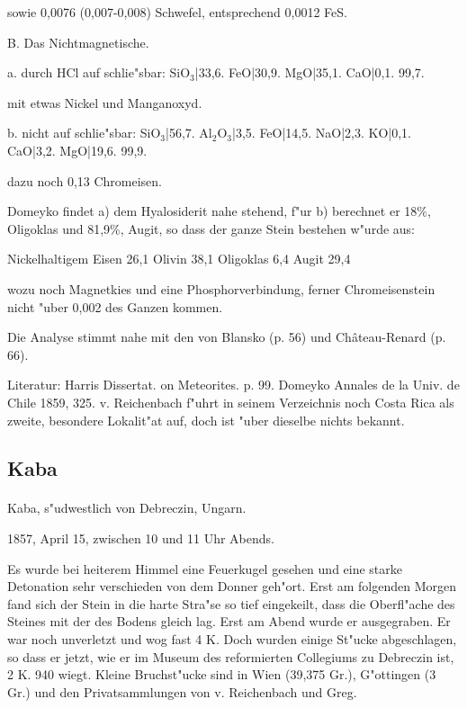 \documentclass[a4paper, 11pt, oneside]{article}
\begin{document}
sowie 0,0076 (0,007-0,008) Schwefel, entsprechend 0,0012 FeS.

B. Das Nichtmagnetische.

a. durch HCl auf schlie"sbar:  
SiO$_{3}$|33,6.  
FeO|30,9.  
MgO|35,1.  
CaO|0,1.  
99,7.

mit etwas Nickel und Manganoxyd.

b. nicht auf schlie"sbar:  
SiO$_{3}$|56,7.  
Al$_{2}$O$_{3}$|3,5.  
FeO|14,5.  
NaO|2,3.  
KO|0,1.  
CaO|3,2.  
MgO|19,6.  
99,9.

dazu noch 0,13 Chromeisen.

Domeyko findet a) dem Hyalosiderit nahe stehend, f"ur b) berechnet er 18\%, Oligoklas und 81,9\%, Augit, so dass der ganze Stein bestehen w"urde aus:

Nickelhaltigem Eisen 26,1  
Olivin 38,1  
Oligoklas 6,4  
Augit 29,4

wozu noch Magnetkies und eine Phosphorverbindung, ferner Chromeisenstein nicht "uber 0,002 des Ganzen kommen.

Die Analyse stimmt nahe mit den von Blansko (p. 56) und Château-Renard (p. 66).

Literatur: Harris Dissertat. on Meteorites. p. 99. Domeyko Annales de la Univ. de Chile 1859, 325. v. Reichenbach f"uhrt in seinem Verzeichnis noch Costa Rica als zweite, besondere Lokalit"at auf, doch ist "uber dieselbe nichts bekannt.

\subsection{Kaba}
\normalsize
\paragraph{}
Kaba, s"udwestlich von Debreczin, Ungarn.

1857, April 15, zwischen 10 und 11 Uhr Abends.

Es wurde bei heiterem Himmel eine Feuerkugel gesehen und eine starke Detonation sehr verschieden von dem Donner geh"ort. Erst am folgenden Morgen fand sich der Stein in die harte Stra"se so tief eingekeilt, dass die Oberfl"ache des Steines mit der des Bodens gleich lag. Erst am Abend wurde er ausgegraben. Er war noch unverletzt und wog fast 4 K. Doch wurden einige St"ucke abgeschlagen, so dass er jetzt, wie er im Museum des reformierten Collegiums zu Debreczin ist, 2 K. 940 wiegt. Kleine Bruchst"ucke sind in Wien (39,375 Gr.), G"ottingen (3 Gr.) und den Privatsammlungen von v. Reichenbach und Greg.
\end{document}
